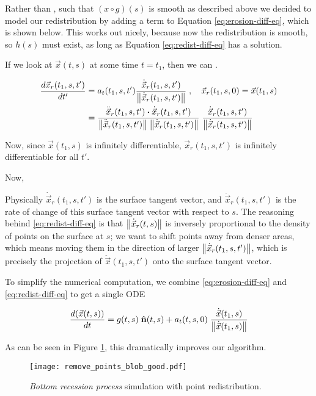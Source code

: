 Rather than , such that $(x \circ g)(s)$ is smooth as described above we decided to model our redistribution by adding a term to Equation \ref{eq:erosion-diff-eq}, which is shown below. This works out nicely, because now the redistribution is smooth, so $h(s)$ must exist, as long as Equation \ref{eq:redist-diff-eq} has a solution.

If we look at $\vec{x}(t, s)$ at some time $t = t_1$, then we can .

\begin{align}
  \frac{d\vec{x}_{r}(t_1, s, t')}{dt'}& = a_t(t_1, s, t') \frac{\dot{\vec{x}}_r(t_1, s, t')}{\norm{\dot{\vec{x}}_r(t_1, s, t')}} \; , \quad \vec{x}_r(t_1, s, 0) = \vec{x}(t_1, s)  \notag \\
  &= \frac{\ddot{\vec{x}}_r(t_1, s, t') \boldsymbol{\cdot} \dot{\vec{x}}_r(t_1, s, t')}{\norm{\ddot{\vec{x}}_r(t_1, s, t')} \; \norm{\dot{\vec{x}}_r(t_1, s, t')}} \; \frac{\dot{\vec{x}}_r(t_1, s, t')}{\norm{\dot{\vec{x}}_r(t_1, s, t')}} \label{eq:redist-diff-eq}
\end{align}

Now, since $\vec{x}(t_1, s)$ is infinitely differentiable, $\vec{x}_r(t_1, s, t')$ is infinitely differentiable for all $t'$. 

Now, 

Physically $\dot{\vec{x}}_r(t_1, s, t')$ is the surface tangent vector, and $\ddot{\vec{x}}_r(t_1, s, t')$ is the rate of change of this surface tangent vector with respect to $s$. The reasoning behind \ref{eq:redist-diff-eq} is that $\norm{\dot{\vec{x}}_r(t, s)}$ is inversely proportional to the density of points on the surface at $s$; we want to shift points away from denser areas, which means moving them in the direction of larger $\norm{\dot{\vec{x}}_r(t_1, s, t')}$, which is precisely the projection of $\ddot{\vec{x}}(t_1, s, t')$ onto the surface tangent vector. 

To simplify the numerical computation, we combine \ref{eq:erosion-diff-eq} and \ref{eq:redist-diff-eq} to get a single ODE

\begin{equation}
  \frac{d(\vec{x}(t, s))}{dt} = g(t, s) \; \bhat{n}(t, s) + a_t(t, s, 0) \; \frac{\dot{\vec{x}}(t_1, s)}{\norm{\dot{\vec{x}}(t_1, s)}}
\end{equation}

As can be seen in Figure \ref{fig:remove-points-blob-good}, this dramatically improves our algorithm.

\begin{figure}[H]
    \begin{center}
      \texttt{[image: remove\_points\_blob\_good.pdf]}
    \end{center}
  \vspace{-.2in} %
  \caption{\label{fig:remove-points-blob-good}\textit{Bottom recession process} simulation with point redistribution.}
\end{figure}

